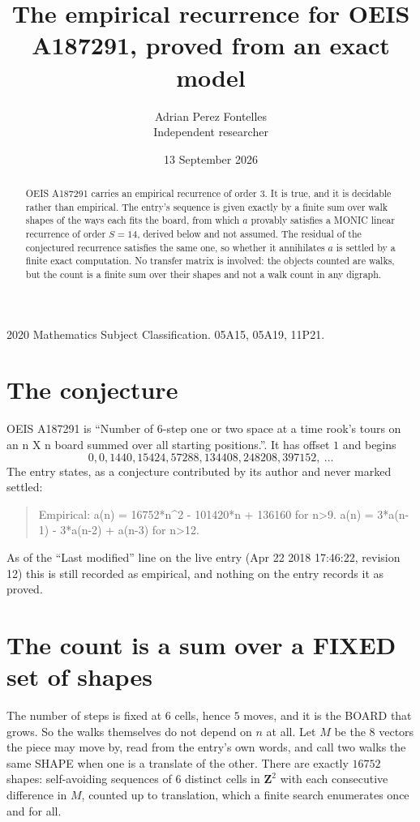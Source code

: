 \documentclass[11pt,a4paper]{article}
\title{The empirical recurrence for OEIS A187291, proved from an exact model}
\author{Adrian Perez Fontelles\\ \small Independent researcher}
\date{13 September 2026}
\theoremstyle{plain}
\theoremstyle{definition}
\begin{document}
\maketitle

\begin{abstract}
OEIS A187291 carries an empirical recurrence of order $3$. It is true, and it is
decidable rather than empirical. The entry's sequence is given exactly by a finite sum over walk shapes of the ways each fits the board, from
which $a$ provably satisfies a MONIC linear recurrence of order $S=14$, derived below and not
assumed. The residual of the conjectured recurrence satisfies the same one, so whether it
annihilates $a$ is settled by a finite exact computation. No transfer matrix is involved: the objects counted are walks, but the count is a finite sum over their shapes and not a walk count in any digraph.
\end{abstract}

\noindent\small 2020 Mathematics Subject Classification. 05A15, 05A19, 11P21.\normalsize

\section{The conjecture}

OEIS A187291 is ``Number of 6-step one or two space at a time rook's tours on an n X n board summed over all starting positions.''. It has offset $1$ and begins
\[
0, 0, 1440, 15424, 57288, 134408, 248208, 397152,\ \dots
\]
The entry states, as a conjecture contributed by its author and never marked settled:
\begin{quote}
Empirical: a(n) = 16752*n\^{}2 - 101420*n + 136160 for n>9. a(n) = 3*a(n-1) - 3*a(n-2) + a(n-3) for n>12.
\end{quote}
As of the ``Last modified'' line on the live entry (Apr 22 2018 17:46:22, revision 12)
this is still recorded as empirical, and nothing on the entry records it as proved.

\section{The count is a sum over a FIXED set of shapes}

The number of steps is fixed at $6$ cells, hence $5$ moves, and it is the BOARD
that grows. So the walks themselves do not depend on $n$ at all. Let $M$ be the $8$
vectors the piece may move by, read from the entry's own words, and call two walks the same
SHAPE when one is a translate of the other. There are exactly $16752$ shapes: self-avoiding
sequences of $6$ distinct cells in $\mathbf{Z}^{2}$ with each consecutive difference in
$M$, counted up to translation, which a finite search enumerates once and for all.
\end{document}

